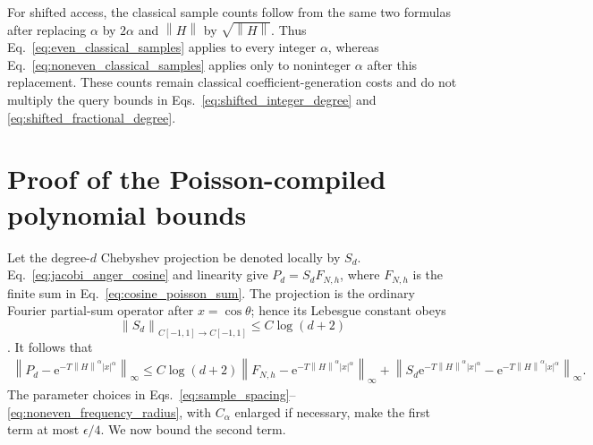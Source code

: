 \documentclass[aps,pra,reprint,floatfix,unsortedaddress,superscriptaddress]{revtex4-2}
\newcommand{\norm}[1]{\left\lVert#1\right\rVert}
\newcommand{\abs}[1]{\left\lvert#1\right\rvert}
\begin{document}
For shifted access, the classical sample counts follow from the same
two formulas after replacing $\alpha$ by $2\alpha$ and $\norm{H}$ by
$\sqrt{\norm{H}}$.  Thus Eq.~\eqref{eq:even_classical_samples}
applies to every integer $\alpha$, whereas
Eq.~\eqref{eq:noneven_classical_samples} applies only to noninteger
$\alpha$ after this replacement.  These counts remain classical
coefficient-generation costs and do not multiply the query bounds in
Eqs.~\eqref{eq:shifted_integer_degree} and
\eqref{eq:shifted_fractional_degree}.

\section{Proof of the Poisson-compiled polynomial bounds}
\label{app:poisson_compilation}

Let the degree-$d$ Chebyshev projection be denoted locally by
$S_d$.  Eq.~\eqref{eq:jacobi_anger_cosine} and linearity give
$P_d=S_d F_{N,h}$, where $F_{N,h}$ is the finite sum in
Eq.~\eqref{eq:cosine_poisson_sum}.  The projection is the ordinary
Fourier partial-sum operator after $x=\cos\theta$; hence its Lebesgue
constant obeys
\begin{equation}
    \norm{S_d}_{C[-1,1]\to C[-1,1]}
    \leq C\log(d+2)
    \label{eq:chebyshev_projection_norm}
\end{equation}
\cite{mason2003chebyshev,trefethen2019approximation}.  It follows that
\begin{align}
\norm{P_d-\mathrm e^{-T\norm{H}^{\alpha}\abs{x}^{\alpha}}}_\infty
\leq C\log(d+2)
\norm{F_{N,h}-\mathrm e^{-T\norm{H}^{\alpha}\abs{x}^{\alpha}}}_\infty
+
\norm{S_d\mathrm e^{-T\norm{H}^{\alpha}\abs{x}^{\alpha}}
-\mathrm e^{-T\norm{H}^{\alpha}\abs{x}^{\alpha}}}_\infty.
\label{eq:projection_error_split}
\end{align}
The parameter choices in
Eqs.~\eqref{eq:sample_spacing}--\eqref{eq:noneven_frequency_radius},
with $C_\alpha$ enlarged if necessary, make the first term at most
$\epsilon/4$.  We now bound the second term.
\end{document}
